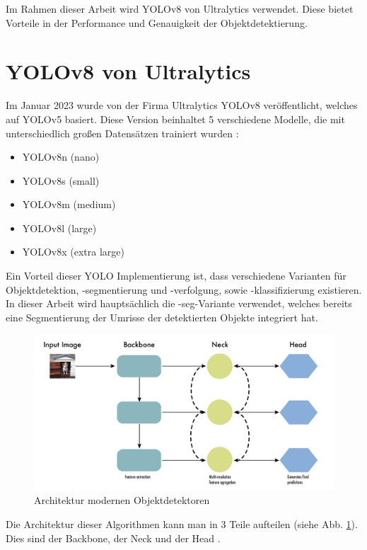 {{	Im Rahmen dieser Arbeit wird YOLOv8 von Ultralytics verwendet. Diese bietet Vorteile in der Performance und Genauigkeit der Objektdetektierung.
	} 

	\section{YOLOv8 von Ultralytics}{ \label{subsec:YOLOv8_theoretic}
	
	Im Januar 2023 wurde von der Firma Ultralytics YOLOv8 veröffentlicht, welches auf YOLOv5 basiert. Diese Version beinhaltet 5 verschiedene Modelle, die mit unterschiedlich großen Datensätzen trainiert wurden  \citep{Terven2023}: 
	\begin{itemize}
		\item YOLOv8n (nano)
		\item YOLOv8s (small)
		\item YOLOv8m (medium)
		\item YOLOv8l (large)
		\item YOLOv8x (extra large)
	\end{itemize}
	Ein Vorteil dieser YOLO Implementierung ist, dass verschiedene Varianten für Objektdetektion, -segmentierung und -verfolgung, sowie -klassifizierung existieren. In dieser Arbeit wird hauptsächlich die \grqq -seg\glqq{}-Variante verwendet, welches bereits eine Segmentierung der Umrisse der detektierten Objekte integriert hat.
	\begin{figure}[h]
		\centering
		\includegraphics*[scale = 0.25, keepaspectratio]{images/YOLO/YOLOv8_object_detector_general.png}
		\caption[Architektur modernen Objektdetektoren]{Architektur modernen Objektdetektoren \citep{Terven2023}}
		\label{YOLO_obj_det_gen}
	\end{figure}
	Die Architektur dieser Algorithmen kann man in 3 Teile aufteilen (siehe Abb. \ref{YOLO_obj_det_gen}). Dies sind der Backbone, der Neck und der Head \citep{Terven2023}. \\
}}
